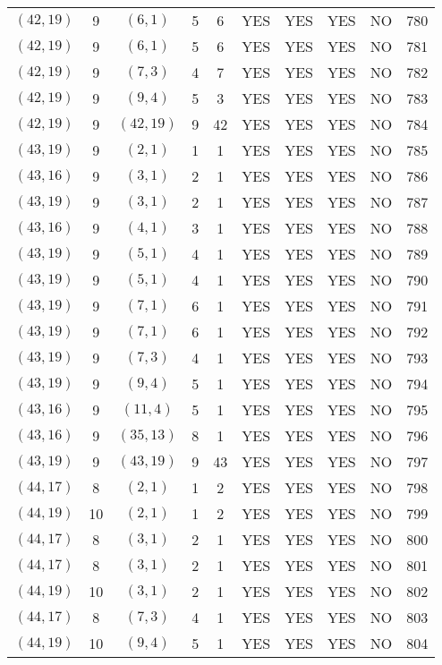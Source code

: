 \begin{longtable}{|c|c|c|c|c|c|c|c|c|c|}
$(42, 19)$ & 9 & $(6, 1)$ & 5 & 6 & YES & YES & YES & NO & 780\\
$(42, 19)$ & 9 & $(6, 1)$ & 5 & 6 & YES & YES & YES & NO & 781\\
$(42, 19)$ & 9 & $(7, 3)$ & 4 & 7 & YES & YES & YES & NO & 782\\
$(42, 19)$ & 9 & $(9, 4)$ & 5 & 3 & YES & YES & YES & NO & 783\\
$(42, 19)$ & 9 & $(42, 19)$ & 9 & 42 & YES & YES & YES & NO & 784\\
$(43, 19)$ & 9 & $(2, 1)$ & 1 & 1 & YES & YES & YES & NO & 785\\
$(43, 16)$ & 9 & $(3, 1)$ & 2 & 1 & YES & YES & YES & NO & 786\\
$(43, 19)$ & 9 & $(3, 1)$ & 2 & 1 & YES & YES & YES & NO & 787\\
$(43, 16)$ & 9 & $(4, 1)$ & 3 & 1 & YES & YES & YES & NO & 788\\
$(43, 19)$ & 9 & $(5, 1)$ & 4 & 1 & YES & YES & YES & NO & 789\\
$(43, 19)$ & 9 & $(5, 1)$ & 4 & 1 & YES & YES & YES & NO & 790\\
$(43, 19)$ & 9 & $(7, 1)$ & 6 & 1 & YES & YES & YES & NO & 791\\
$(43, 19)$ & 9 & $(7, 1)$ & 6 & 1 & YES & YES & YES & NO & 792\\
$(43, 19)$ & 9 & $(7, 3)$ & 4 & 1 & YES & YES & YES & NO & 793\\
$(43, 19)$ & 9 & $(9, 4)$ & 5 & 1 & YES & YES & YES & NO & 794\\
$(43, 16)$ & 9 & $(11, 4)$ & 5 & 1 & YES & YES & YES & NO & 795\\
$(43, 16)$ & 9 & $(35, 13)$ & 8 & 1 & YES & YES & YES & NO & 796\\
$(43, 19)$ & 9 & $(43, 19)$ & 9 & 43 & YES & YES & YES & NO & 797\\
$(44, 17)$ & 8 & $(2, 1)$ & 1 & 2 & YES & YES & YES & NO & 798\\
$(44, 19)$ & 10 & $(2, 1)$ & 1 & 2 & YES & YES & YES & NO & 799\\
$(44, 17)$ & 8 & $(3, 1)$ & 2 & 1 & YES & YES & YES & NO & 800\\
$(44, 17)$ & 8 & $(3, 1)$ & 2 & 1 & YES & YES & YES & NO & 801\\
$(44, 19)$ & 10 & $(3, 1)$ & 2 & 1 & YES & YES & YES & NO & 802\\
$(44, 17)$ & 8 & $(7, 3)$ & 4 & 1 & YES & YES & YES & NO & 803\\
$(44, 19)$ & 10 & $(9, 4)$ & 5 & 1 & YES & YES & YES & NO & 804\\

\end{longtable}
